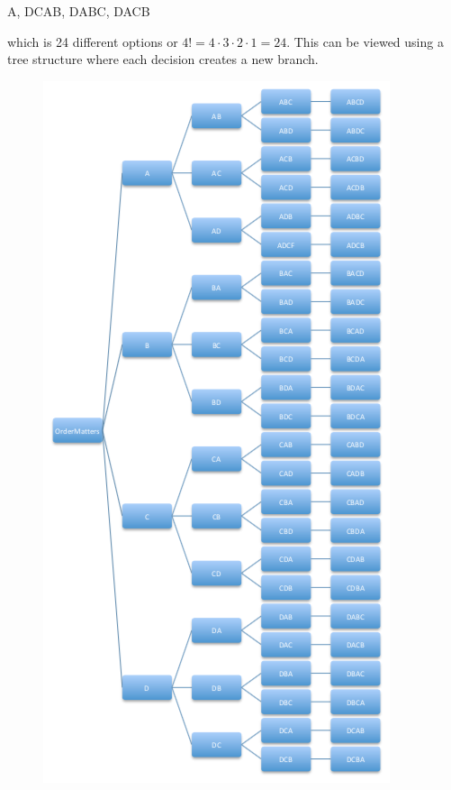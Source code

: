 \documentclass[10pt,]{book}
\numberwithin{equation}{section}
\begin{document}
A, DCAB, DABC, DACB%
\par
\hypertarget{p-366}{}%
which is 24 different options or \(4! = 4 \cdot 3 \cdot 2 \cdot 1 = 24\).  This can be viewed using a tree structure where each decision creates a new branch. \begin{figure}\centering\includegraphics[width=1\linewidth]{images/PermutationAllTree.png}
\end{figure}%
\end{document}
